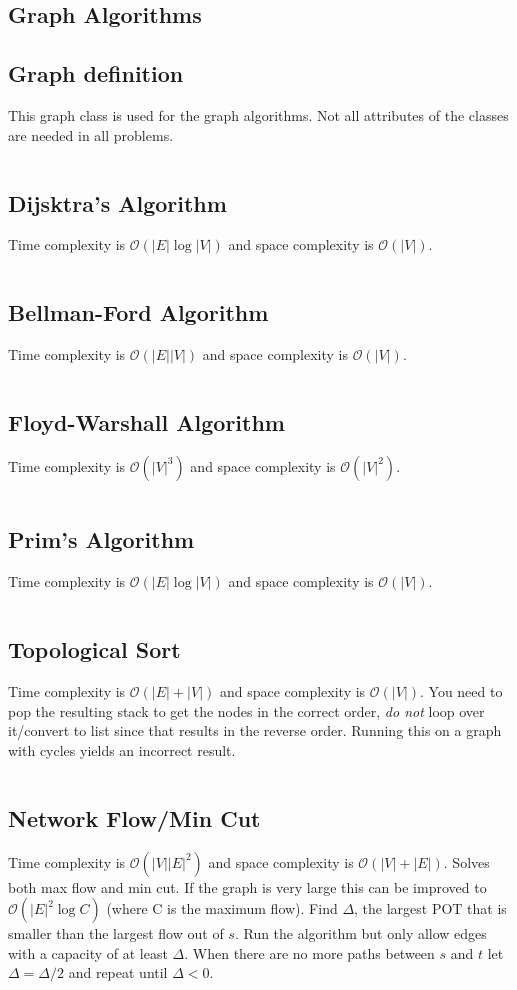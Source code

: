 \documentclass[8pt,a4paper,landscape,oneside]{amsart}
\newcommand{\code}[1]{\inputminted[fontsize=\normalsize,baselinestretch=1]{java}{code/#1}}
\newcommand{\bigO}{\mathcal{O}}
\begin{document}
\begin{multicols*}{3}
  
\section{Graph Algorithms}
  \subsection{Graph definition}
  This graph class is used for the graph algorithms. Not all attributes of the classes are needed in all problems.
  \code{Graphs/Graph.java}
  
  \subsection{Dijsktra's Algorithm}
  Time complexity is $\bigO(|E| \log{|V|})$ and space complexity is $\bigO(|V|)$.
  \code{Graphs/Dijkstras.java}
  
  \subsection{Bellman-Ford Algorithm}
  Time complexity is $\bigO(|E||V|)$ and space complexity is $\bigO(|V|)$.
  \code{Graphs/BellmanFord.java}
  
  \subsection{Floyd-Warshall Algorithm}
  Time complexity is $\bigO(|V|^3)$ and space complexity is $\bigO(|V|^2)$.
  \code{Graphs/FloydWarshall.java}
  
  \subsection{Prim's Algorithm}
  Time complexity is $\bigO(|E| \log{|V|})$ and space complexity is $\bigO(|V|)$.
  \code{Graphs/MST.java}
  
  \subsection{Topological Sort}
  Time complexity is $\bigO(|E| + |V|)$ and space complexity is $\bigO(|V|)$. You need to pop the resulting stack to get the nodes in the correct order, \textit{do not} loop over it/convert to list since that results in the reverse order. Running this on a graph with cycles yields an incorrect result.
  \code{Graphs/TopologicalSort.java}
  
  \subsection{Network Flow/Min Cut}
  Time complexity is $\bigO(|V||E|^2)$ and space complexity is $\bigO(|V|+|E|)$. Solves both max flow and min cut. If the graph is very large this can be improved to $\bigO(|E|^2 \log{C})$ (where C is the maximum flow). Find $\Delta$, the largest POT that is smaller than the largest flow out of $s$. Run the algorithm but only allow edges with a capacity of at least $\Delta$. When there are no more paths between $s$ and $t$ let $\Delta = \Delta / 2$ and repeat until $\Delta < 0$.
  \code{Graphs/NetworkFlow.java}
  

\end{multicols*}
\end{document}
